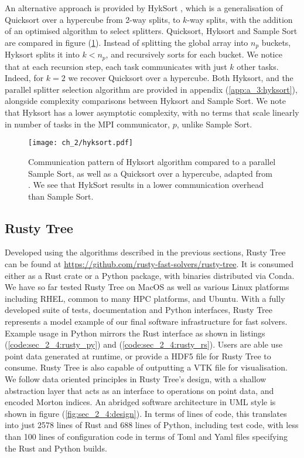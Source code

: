 An alternative approach is provided by HykSort \cite{sundar2013hyksort}, which is a generalisation of Quicksort over a hypercube \cite{wagar1987hyperquicksort} from 2-way splits, to $k$-way splits, with the addition of an optimised algorithm to select splitters. Quicksort, Hyksort and Sample Sort are compared in figure (\ref{fig:sec_2_4:hyksort}). Instead of splitting the global array into $n_p$ buckets, Hyksort splits it into $k < n_p$, and recursively sorts for each bucket. We notice that at each recursion step, each task communicates with just $k$ other tasks. Indeed, for $k=2$ we recover Quicksort over a hypercube. Both Hyksort, and the parallel splitter selection algorithm are provided in appendix (\ref{app:a_3:hyksort}), alongside complexity comparisons between Hyksort and Sample Sort. We note that Hyksort has a lower asymptotic complexity, with no terms that scale linearly in number of tasks in the MPI communicator, $p$, unlike Sample Sort.

\begin{figure}
    \centerline{\texttt{[image: ch\_2/hyksort.pdf]}}
    \caption{Communication pattern of Hyksort algorithm compared to a parallel Sample Sort, as well as a Quicksort over a hypercube, adapted from \cite{sundar2013hyksort}. We see that HykSort results in a lower communication overhead than Sample Sort.}
    \label{fig:sec_2_4:hyksort}
\end{figure}

\subsection*{Rusty Tree}

Developed using the algorithms described in the previous sections, Rusty Tree can be found at \url{https://github.com/rusty-fast-solvers/rusty-tree}. It is consumed either as a Rust crate or a Python package, with binaries distributed via Conda. We have so far tested Rusty Tree on MacOS as well as various Linux platforms including RHEL, common to many HPC platforms, and Ubuntu. With a fully developed suite of tests, documentation and Python interfaces, Rusty Tree represents a model example of our final software infrastructure for fast solvers. Example usage in Python mirrors the Rust interface as shown in listings (\ref{code:sec_2_4:rusty_py}) and (\ref{code:sec_2_4:rusty_rs}). Users are able use point data generated at runtime, or provide a HDF5 file for Rusty Tree to consume. Rusty Tree is also capable of outputting a VTK file for visualisation.  We follow data oriented principles in Rusty Tree's design, with a shallow abstraction layer that acts as an interface to operations on point data, and encoded Morton indices. An abridged software architecture in UML style is shown in figure (\ref{fig:sec_2_4:design}). In terms of lines of code, this translates into just 2578 lines of Rust and 688 lines of Python, including test code, with less than 100 lines of configuration code in terms of Toml and Yaml files specifying the Rust and Python builds.


